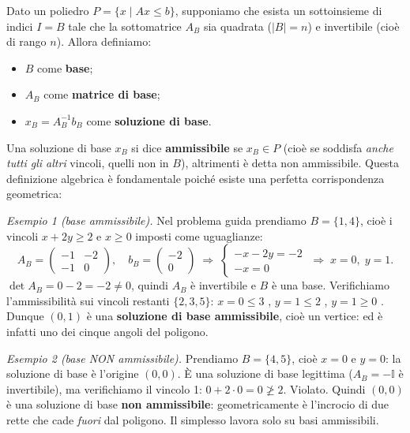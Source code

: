 \documentclass[12pt]{extarticle} %
\begin{document}
\medskip
\noindent Dato un poliedro $P = \{x \mid Ax \le b\}$, supponiamo che esista un sottoinsieme di indici $I = B$ tale che la sottomatrice $A_B$ sia quadrata ($|B| = n$) e invertibile (cioè di rango $n$). Allora definiamo:
\begin{itemize}
    \item $B$ come \textbf{base};
    \item $A_B$ come \textbf{matrice di base};
    \item $x_B = A_B^{-1} b_B$ come \textbf{soluzione di base}.
\end{itemize}

Una soluzione di base $x_B$ si dice \textbf{ammissibile} se $x_B \in P$ (cioè se soddisfa \emph{anche tutti gli altri} vincoli, quelli non in $B$), altrimenti è detta non ammissibile. Questa definizione algebrica è fondamentale poiché esiste una perfetta corrispondenza geometrica:
\begin{center}
\end{center}

\noindent\textit{Esempio 1 (base ammissibile).} Nel problema guida prendiamo $B=\{1,4\}$, cioè i vincoli $x+2y\ge2$ e $x\ge0$ imposti come uguaglianze:
\[
A_B=\begin{pmatrix} -1 & -2 \\ -1 & 0\end{pmatrix},\quad b_B=\begin{pmatrix}-2\\0\end{pmatrix}
\;\Longrightarrow\;
\begin{cases} -x-2y=-2\\ -x=0\end{cases}
\;\Longrightarrow\; x=0,\; y=1.
\]
$\det A_B = 0 - 2 = -2 \ne 0$, quindi $A_B$ è invertibile e $B$ è una base. Verifichiamo l'ammissibilità sui vincoli restanti $\{2,3,5\}$: $x=0\le3$ \checkmark, $y=1\le2$ \checkmark, $y=1\ge0$ \checkmark. Dunque $(0,1)$ è una \textbf{soluzione di base ammissibile}, cioè un vertice: ed è infatti uno dei cinque angoli del poligono.

\noindent\textit{Esempio 2 (base NON ammissibile).} Prendiamo $B=\{4,5\}$, cioè $x=0$ e $y=0$: la soluzione di base è l'origine $(0,0)$. È una soluzione di base legittima ($A_B = -\mathbb{I}$ è invertibile), ma verifichiamo il vincolo 1: $0+2\cdot0=0 \not\ge 2$. Violato. Quindi $(0,0)$ è una soluzione di base \textbf{non ammissibile}: geometricamente è l'incrocio di due rette che cade \emph{fuori} dal poligono. Il simplesso lavora solo su basi ammissibili.
\end{document}
